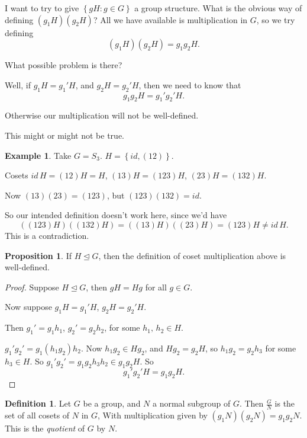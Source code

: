\documentclass{article}
\theoremstyle{definition}
\newtheorem{definition}{Definition}
\newtheorem{proposition}{Proposition}
\newtheorem*{exmp}{Example}
\begin{document}
I want to try to give $\left\{ gH:g\in G \right\}$ a group structure. What is the obvious way of defining $(g_1 H)(g_2 H)$? All we have available is multiplication in $G$, so we try defining
\[
  (g_1 H )(g_2 H) = g_1 g_2 H.
\]

What possible problem is there? 

Well, if $g_1 H=g_1'H$, and $g_2 H=g_2' H$, then we need to know that
\[
  g_1g_2 H = g_1' g_2' H.
\]

Otherwise our multiplication will not be well-defined.

This might or might not be true.\\

\begin{exmp}
  Take $G = S_3$. $H = \left\{ id, (12) \right\}$.

  Cosets $id\, H=(12)H=H$, $(13)H=(123)H$, $(23)H=(132)H$.

  Now $(13)(23)=(123)$, but $(123)(132)=id$.

  So our intended definition doesn't work here, since we'd have 
  \[
    ((123)H)((132)H)=((13)H)(\left( 23 \right)H)=(123)H \neq id\,H.
  \]
  This is a contradiction.\\
\end{exmp}

\begin{proposition}
  If $H \trianglelefteq G$, then the definition of coset multiplication above is well-defined.
\end{proposition}

\begin{proof}
  Suppose $H \trianglelefteq G$, then $gH=Hg$ for all $g \in G$.

  Now suppose $g_1H=g_1'H$, $g_2H=g_2'H$.

  Then $g_1' = g_1h_1$, $g_2'=g_2h_2$, for some $h_1,\,h_2 \in H$.

  $g_1'g_2'=g_1(h_1g_2)h_2$. Now $h_1g_2 \in Hg_2$, and $Hg_2=g_2H$, so $h_1g_2=g_2h_3$ for some $h_3 \in H$. So $g_1'g_2'=g_1g_2h_3h_2 \in g_1g_2H$. So
  \[
    g_1'g_2'H = g_1g_2H.
  \]
\end{proof}

\begin{definition}
  Let $G$ be a group, and $N$ a normal subgroup of $G$. Then $\frac{G}{N}$ is the set of all cosets of $N$ in $G$, With multiplication given by $(g_1N)(g_2N)=g_1g_2N$. This is the \emph{quotient} of $G$ by $N$.\\
\end{definition}
\end{document}
